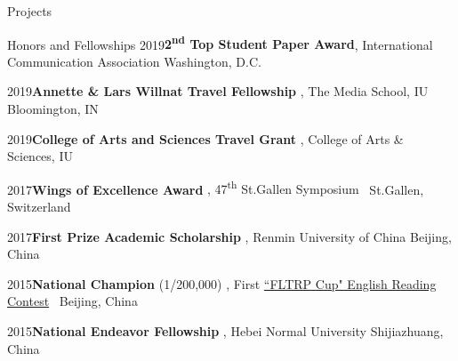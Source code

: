 \documentclass{resume}
\begin{document}
\begin{rSection}{Projects}

\end{rSection}

\begin{rSection}{Honors and Fellowships} 
{2019\hspace{1em}}{\bf 2\textsuperscript{nd} Top Student Paper Award}{, International Communication Association} \hfill Washington, D.C. \vspace{-0.5em}

{2019\hspace{1em}}{\bf Annette \& Lars Willnat Travel Fellowship}{ , The Media School, IU} {\hfill Bloomington, IN} \vspace{-0.5em}

{2019\hspace{1em}}{\bf College of Arts and Sciences Travel Grant}{ , College of Arts \& Sciences, IU} \vspace{-0.5em}

{2017\hspace{1em}}{\bf  Wings of Excellence Award}{ , 47\textsuperscript{th} St.Gallen Symposium} \hfill{\ {St.Gallen, Switzerland}} \vspace{-0.5em}

{2017\hspace{1em}}{\bf First Prize Academic Scholarship}{ , Renmin University of China} {\hfill Beijing, China} \vspace{-0.5em}

{2015\hspace{1em}}{\bf National Champion} (1/200,000) { , First \href{http://uchallenge.unipus.cn/2018/constitution/reading/447651.shtml}{``FLTRP Cup" English Reading Contest}
} \hfill{\ {Beijing, China}}

{\vspace{-0.5em} 2015\hspace{1em}}{\bf National Endeavor Fellowship}{ , Hebei Normal University} {\hfill Shijiazhuang, China}

\end{rSection}
\end{document}
